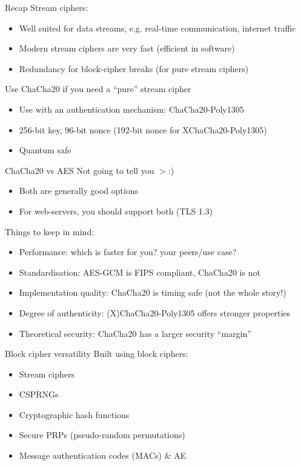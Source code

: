 \begin{frame}{Recap}
  Stream ciphers:
  \begin{itemize}[<+(1)->]
    \item Well suited for data streams, e.g. real-time communication, internet traffic
    \item Modern stream ciphers are very fast (efficient in software)
    \item Redundancy for block-cipher breaks (for pure stream ciphers)
  \end{itemize}

  \vspace*{1em}

  \pause
  Use ChaCha20 if you need a \enquote{pure} stream cipher
  \begin{itemize}[<+(1)->]
    \item Use with an authentication mechanism: ChaCha20-Poly1305
    \item 256-bit key, 96-bit nonce (192-bit nonce for XChaCha20-Poly1305)
    \item Quantum safe
  \end{itemize}
\end{frame}

\begin{frame}{ChaCha20 vs AES}
  \pause
  Not going to tell you $>$:)
  \begin{itemize}[<+(1)->]
    \item Both are generally good options
    \item For web-servers, you should support both (TLS 1.3)
  \end{itemize}

  \pause
  Things to keep in mind:
  \begin{itemize}[<+(1)->]
    \item Performance: which is faster for you? your peers/use case?
    \item Standardisation: AES-GCM is FIPS compliant, ChaCha20 is not
    \item Implementation quality: ChaCha20 is timing safe (not the whole story!)
    \item Degree of authenticity: (X)ChaCha20-Poly1305 offers stronger properties
    \item Theoretical security: ChaCha20 has a larger security \enquote{margin}
  \end{itemize}
\end{frame}

\begin{frame}{Block cipher versatility}
  Built using block ciphers:
  \begin{itemize}[<+(1)->]
    \item Stream ciphers
    \item CSPRNGs
    \item Cryptographic hash functions
    \item Secure PRPs (pseudo-random permutations)
    \item Message authentication codes (MACs) \& AE
  \end{itemize}
\end{frame}

